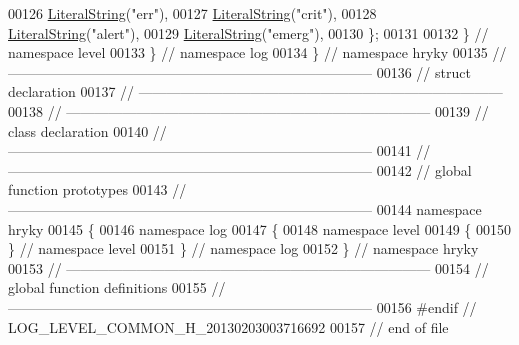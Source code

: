 \begin{DoxyCode}
00126         \hyperlink{classhryky_1_1_literal_string}{LiteralString}(\textcolor{stringliteral}{"err"}),
00127         \hyperlink{classhryky_1_1_literal_string}{LiteralString}(\textcolor{stringliteral}{"crit"}),
00128         \hyperlink{classhryky_1_1_literal_string}{LiteralString}(\textcolor{stringliteral}{"alert"}),
00129         \hyperlink{classhryky_1_1_literal_string}{LiteralString}(\textcolor{stringliteral}{"emerg"}),
00130     \};
00131     
00132 \} \textcolor{comment}{// namespace level}
00133 \} \textcolor{comment}{// namespace log}
00134 \} \textcolor{comment}{// namespace hryky}
00135 \textcolor{comment}{//
      ------------------------------------------------------------------------------}
00136 \textcolor{comment}{// struct declaration}
00137 \textcolor{comment}{//
      ------------------------------------------------------------------------------}
00138 \textcolor{comment}{//
      ------------------------------------------------------------------------------}
00139 \textcolor{comment}{// class declaration}
00140 \textcolor{comment}{//
      ------------------------------------------------------------------------------}
00141 \textcolor{comment}{//
      ------------------------------------------------------------------------------}
00142 \textcolor{comment}{// global function prototypes}
00143 \textcolor{comment}{//
      ------------------------------------------------------------------------------}
00144 \textcolor{keyword}{namespace }hryky
00145 \{
00146 \textcolor{keyword}{namespace }log
00147 \{
00148 \textcolor{keyword}{namespace }level
00149 \{
00150 \} \textcolor{comment}{// namespace level}
00151 \} \textcolor{comment}{// namespace log}
00152 \} \textcolor{comment}{// namespace hryky}
00153 \textcolor{comment}{//
      ------------------------------------------------------------------------------}
00154 \textcolor{comment}{// global function definitions}
00155 \textcolor{comment}{//
      ------------------------------------------------------------------------------}
00156 \textcolor{preprocessor}{#endif // LOG\_LEVEL\_COMMON\_H\_20130203003716692}
00157 \textcolor{preprocessor}{}\textcolor{comment}{// end of file}
\end{DoxyCode}
